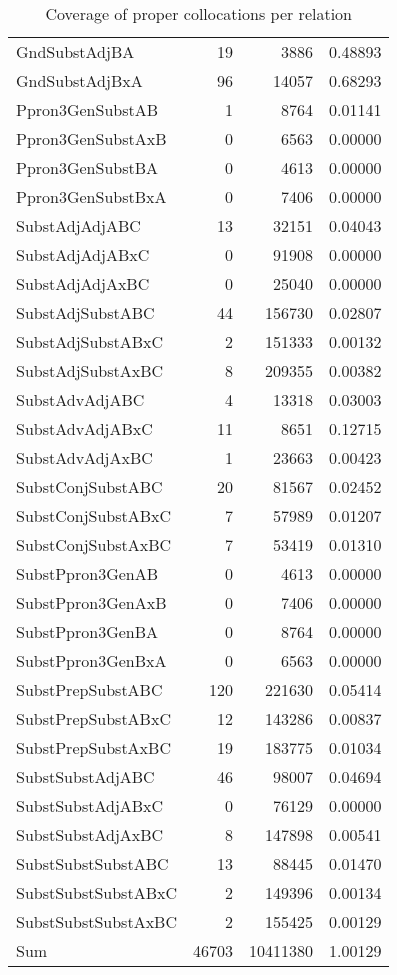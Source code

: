 \begin{table}[t]
\begin{tabular}{|l|r|r| r|}
        GndSubstAdjBA & 19 & 3886 & 0.48893 \\
        GndSubstAdjBxA & 96 & 14057 & 0.68293 \\
        Ppron3GenSubstAB & 1 & 8764 & 0.01141 \\
        Ppron3GenSubstAxB & 0 & 6563 & 0.00000 \\
        Ppron3GenSubstBA & 0 & 4613 & 0.00000 \\
        Ppron3GenSubstBxA & 0 & 7406 & 0.00000 \\
        SubstAdjAdjABC & 13 & 32151 & 0.04043 \\
        SubstAdjAdjABxC & 0 & 91908 & 0.00000 \\
        SubstAdjAdjAxBC & 0 & 25040 & 0.00000 \\
        SubstAdjSubstABC & 44 & 156730 & 0.02807 \\
        SubstAdjSubstABxC & 2 & 151333 & 0.00132 \\
        SubstAdjSubstAxBC & 8 & 209355 & 0.00382 \\
        SubstAdvAdjABC & 4 & 13318 & 0.03003 \\
        SubstAdvAdjABxC & 11 & 8651 & 0.12715 \\
        SubstAdvAdjAxBC & 1 & 23663 & 0.00423 \\
        SubstConjSubstABC & 20 & 81567 & 0.02452 \\
        SubstConjSubstABxC & 7 & 57989 & 0.01207 \\
        SubstConjSubstAxBC & 7 & 53419 & 0.01310 \\
        SubstPpron3GenAB & 0 & 4613 & 0.00000 \\
        SubstPpron3GenAxB & 0 & 7406 & 0.00000 \\
        SubstPpron3GenBA & 0 & 8764 & 0.00000 \\
        SubstPpron3GenBxA & 0 & 6563 & 0.00000 \\
        SubstPrepSubstABC & 120 & 221630 & 0.05414 \\
        SubstPrepSubstABxC & 12 & 143286 & 0.00837 \\
        SubstPrepSubstAxBC & 19 & 183775 & 0.01034 \\
        SubstSubstAdjABC & 46 & 98007 & 0.04694 \\
        SubstSubstAdjABxC & 0 & 76129 & 0.00000 \\
        SubstSubstAdjAxBC & 8 & 147898 & 0.00541 \\
        SubstSubstSubstABC & 13 & 88445 & 0.01470 \\
        SubstSubstSubstABxC & 2 & 149396 & 0.00134 \\
        SubstSubstSubstAxBC & 2 & 155425 & 0.00129 \\
        \hline
        Sum & 46703 & 10411380 & 1.00129 \\
        \hline
    \end{tabular} 
    \caption{Coverage of proper collocations per relation}
    \label{cover_rel_stats}
\end{table}

